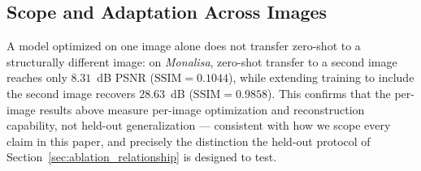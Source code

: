 \documentclass[11pt]{article}
\begin{document}
\begin{table}[t]
\centering
\caption{HVK2D same-set reconstruction across six real image datasets (per-image trained, 80--100 steps, mean $\pm$ std over sampled images).}
\label{tab:sameset_multi_dataset}
\scriptsize
{}
\end{table}

\subsection{Scope and Adaptation Across Images}
\label{sec:no_generalization}
A model optimized on one image alone does not transfer zero-shot to a structurally different image: on \textit{Monalisa}, zero-shot transfer to a second image reaches only $8.31$~dB PSNR ($\mathrm{SSIM}=0.1044$), while extending training to include the second image recovers $28.63$~dB ($\mathrm{SSIM}=0.9858$). This confirms that the per-image results above measure per-image optimization and reconstruction capability, not held-out generalization --- consistent with how we scope every claim in this paper, and precisely the distinction the held-out protocol of Section~\ref{sec:ablation_relationship} is designed to test.
\end{document}
